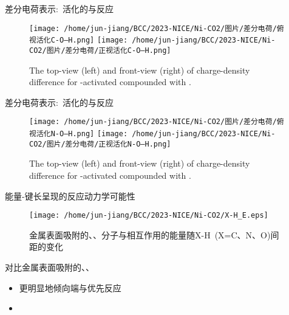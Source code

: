 \begin{frame}[allowframebreaks]
差分电荷表示:~活化的\textrm{}与\textrm{}反应
\begin{figure}[h!]
\centering
\texttt{[image: /home/jun-jiang/BCC/2023-NICE/Ni-CO2/图片/差分电荷/俯视活化C-O---H.png]}
\texttt{[image: /home/jun-jiang/BCC/2023-NICE/Ni-CO2/图片/差分电荷/正视活化C-O---H.png]}
\caption{\tiny \textrm{The top-view (left) and front-view (right) of charge-density difference for -activated compounded with .}}%
\label{Charge-density_difference:CO}
\end{figure}
差分电荷表示:~活化的\textrm{}与\textrm{}反应
\begin{figure}[h!]
\centering
\texttt{[image: /home/jun-jiang/BCC/2023-NICE/Ni-CO2/图片/差分电荷/俯视活化N-O---H.png]}
\texttt{[image: /home/jun-jiang/BCC/2023-NICE/Ni-CO2/图片/差分电荷/正视活化N-O---H.png]}
\caption{\tiny \textrm{The top-view (left) and front-view (right) of charge-density difference for -activated compounded with .}}%
\label{Charge-density_difference:NO}
\end{figure}
能量-键长呈现的反应动力学可能性
\begin{figure}[h!]
\centering
\texttt{[image: /home/jun-jiang/BCC/2023-NICE/Ni-CO2/X-H\_E.eps]}
\caption{\tiny 金属表面吸附的\textrm{、、}分子与\textrm{}相互作用的能量随\textrm{X-H~(X=C、N、O)}间距的变化}%
\label{X-H_E}
\end{figure}
\newpage
对比金属表面吸附的\textrm{}、\textrm{}、\textrm{}
\begin{itemize}
	\item \textrm{}更明显地倾向\textrm{}端与\textrm{}优先反应
	\item \textrm{}
\end{itemize}

\end{frame}
